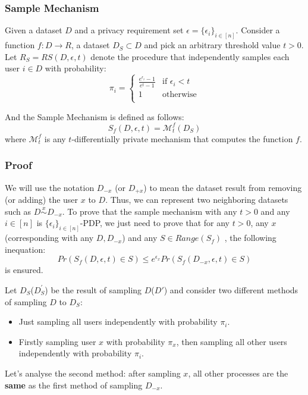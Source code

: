 \documentclass[a4paper,12pt]{article}
\begin{document}
\subsubsection{Sample Mechanism}
Given a dataset $D$ and a privacy requirement set $\epsilon = \{\epsilon_i\}_{i \in [n]}$. Consider a function $f: D \to R$, a dataset $D_S \subset D$ and pick an arbitrary threshold value $t > 0$.
Let $R_S = RS(D, \epsilon, t)$ denote the procedure that independently samples each user $i \in D$ with probability:
\begin{equation}
    \pi_i =
    \begin{cases}
        \frac{e^{\epsilon_i} - 1}{e^t - 1} & \text{if } \epsilon_i < t \\
        1                                  & \text{otherwise}          \\
    \end{cases}
\end{equation}

And the Sample Mechanism is defined as follows:
\begin{equation}
    S_f(D, \epsilon, t) = \mathcal{M}_{t}^{f}(D_S)
\end{equation}
where $\mathcal{M}_{t}^{f}$ is any $t$-differentially private mechanism that computes the function $f$.
\subsubsection{Proof}
We will use the notation $D_{-x}$ (or $D_{+x}$) to mean the dataset result from removing (or adding) the user $x$ to $D$.
Thus, we can represent two neighboring datasets such as $D \overset{x}{\sim} D_{-x}$.
To prove that the sample mechanism with any $t > 0$ and any $i \in [n]$ is $\{\epsilon_i\}_{i\in [n]}$-PDP, we just need to prove that
for any $t > 0$, any $x$ (corresponding with any $D, D_{-x}$) and any $S \in Range(S_f)$ , the following inequation:
\begin{equation}
    Pr(S_f(D, \epsilon, t) \in S) \leq e^{\epsilon_x} Pr(S_f(D_{-x}, \epsilon, t) \in S)
\end{equation}
is ensured.

Let $D_S$($D_{S}^{'}$) be the result of sampling $D$($D'$) and consider two different methods of sampling $D$ to $D_S$:
\begin{itemize}
    \item Just sampling all users independently with probability $\pi_i$.
    \item Firstly sampling user $x$ with probability $\pi_x$, then sampling all other users independently with probability $\pi_i$.
\end{itemize}
Let's analyse the second method: after sampling $x$, all other processes are the \textbf{same} as the first method of sampling $D_{-x}$.
\end{document}
